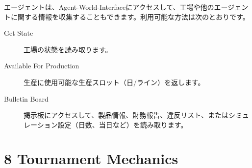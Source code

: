 \documentclass[12pt]{jarticle}
\begin{document}
エージェントは、Agent-World-Interfaceにアクセスして、工場や他のエージェントに関する情報を収集することもできます。利用可能な方法は次のとおりです。

\begin{description}
  \item[Get State] 工場の状態を読み取ります。
  \item[Available For Production] 生産に使用可能な生産スロット（日/ライン）を返します。
  \item[Bulletin Board] 掲示板にアクセスして、製品情報、財務報告、違反リスト、またはシミュレーション設定（日数、当日など）を読み取ります。
\end{description} 

\section{8 Tournament Mechanics}
\end{document}
